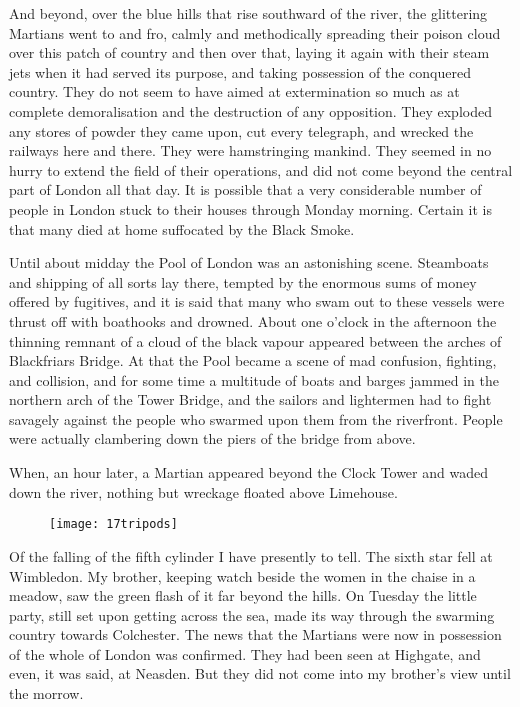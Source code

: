 And beyond, over the blue hills that rise southward of the river, the glittering Martians went to and fro, calmly and methodically spreading their poi\-son cloud over this patch of country and then over that, laying it again with their steam jets when it had served its purpose, and taking possession of the conquered country. They do not seem to have aimed at extermination so much as at complete demoralisation and the destruction of any opposition. They exploded any stores of powder they came upon, cut every telegraph, and wrecked the railways here and there. They were hamstringing mankind. They seemed in no hurry to extend the field of their operations, and did not come beyond the central part of London all that day. It is possible that a very considerable number of people in London stuck to their houses through Monday morning. Certain it is that many died at home suffocated by the Black Smoke.

Until about midday the Pool of London was an astonishing scene. Steamboats and shipping of all sorts lay there, tempted by the enormous sums of money offered by fugitives, and it is said that many who swam out to these vessels were thrust off with boathooks and drowned. About one o'clock in the afternoon the thinning remnant of a cloud of the black vapour appeared between the arches of Blackfriars Bridge. At that the Pool became a scene of mad confusion, fighting, and collision, and for some time a multitude of boats and barges jammed in the northern arch of the Tower Bridge, and the sailors and lightermen had to fight savagely against the people who swarmed upon them from the riverfront. People were actually clambering down the piers of the bridge from above.

When, an hour later, a Martian appeared beyond the Clock Tower and waded down the river, nothing but wreckage floated above Limehouse.

\begin{figure}[tb!]
\centering
\texttt{[image: 17tripods]}
\end{figure}

Of the falling of the fifth cylinder I have presently to tell. The sixth star fell at Wimbledon. My brother, keeping watch beside the women in the chaise in a meadow, saw the green flash of it far beyond the hills. On Tuesday the little party, still set upon getting across the sea, made its way through the swarming country towards Colchester. The news that the Martians were now in possession of the whole of London was confirmed. They had been seen at Highgate, and even, it was said, at Neasden. But they did not come into my brother's view until the morrow.

